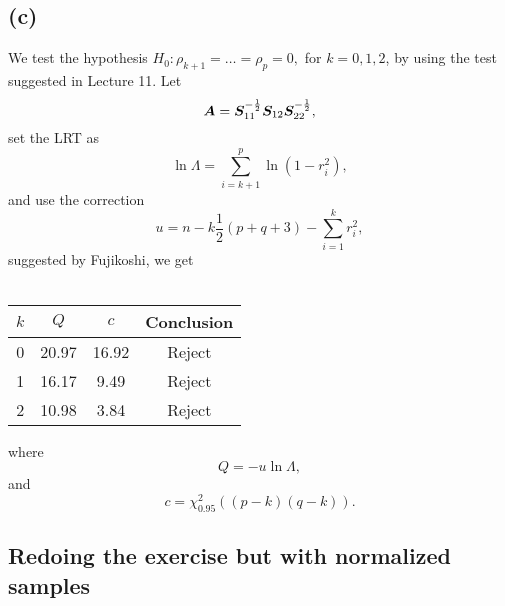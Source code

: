 \subsection*{(c)}
\label{sec:c-9}

We test the hypothesis $H_0: \rho_{k+1} = \dots = \rho_{p} = 0,$ for $k
= 0,1,2$, by using the test suggested in Lecture 11. Let 
\begin{equation*}
  \bm{A} =\bm{S}_{11}^{-\frac 12} \bm{S}_{12}\bm{S}_{22}^{-\frac 12},
\end{equation*}
set the LRT as
\begin{equation*}
  \ln \Lambda = \sum_{i = k+1}^{p} \ln (1 - r^2_{i}),
\end{equation*}
and use the correction 
\begin{equation*}
  u =  n - k \frac 12(p + q  + 3) - \sum_{i = 1}^{k} r^2_i,
\end{equation*}
suggested by Fujikoshi, we get \\
\\
\begin{center}
\begin{tabular}[h]{c|cc|c}
 $k$ &  $Q$ & $c$ & Conclusion\\ \hline
  0& 20.97 &16.92 & Reject\\ 
 1 & 16.17 &9.49 & Reject\\ 
 2 & 10.98 &3.84 & Reject
\end{tabular}
\end{center}
where 
\begin{equation*}
  Q = -u \ln \Lambda,
\end{equation*}
and
\begin{equation*}
  c = \chi^2_{0.95}((p-k)(q-k)).
\end{equation*}

\subsection*{Redoing the exercise but with normalized samples}
\label{sec:redoing-exercise-but}

